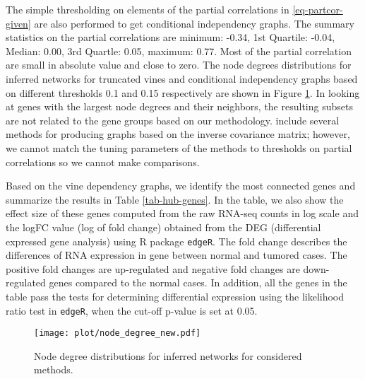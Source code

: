\documentclass[a4paper]{article}
\begin{document}
The simple thresholding on elements of the partial correlations in 
\eqref{eq-partcor-given}
are also performed to get conditional independency graphs. The summary
statistics on the partial correlations are minimum: -0.34, 1st Quartile:
-0.04, Median: 0.00, 3rd Quartle: 0.05, maximum: 0.77. 
Most of the partial correlation are small in absolute value and close to zero. 
 The node degrees distributions for inferred networks for truncated vines
and conditional independency graphs based on different thresholds 0.1 and
{0.15} respectively are shown in Figure \ref{fig-node-distribution}.
{In looking at genes with the largest node degrees and their neighbors,
the resulting subsets are not related to the gene groups based on our
methodology.}
\cite{lin2016estimation} include several methods for producing graphs based
on the inverse covariance matrix; however, we cannot match the tuning
parameters of the methods to thresholds on partial correlations so we cannot
make comparisons. 

Based on the vine dependency graphs, we identify the most connected genes and summarize the results in Table \ref{tab-hub-genes}. 
In the table, we also show the effect size of these genes computed from the
raw RNA-seq counts in log scale and the logFC value (log of fold change)
obtained from the DEG (differential expressed gene analysis) using R package
\texttt{edgeR}.
The fold change describes the differences of RNA expression in gene between normal and tumored cases. The positive fold changes are up-regulated and negative fold changes are down-regulated genes compared to the normal cases.
In addition, all the genes in the table pass the tests for determining
differential expression using the likelihood ratio test in \texttt{edgeR}, when the cut-off p-value is set at 0.05. 

\begin{figure}[!ht]
\centering
\texttt{[image: plot/node\_degree\_new.pdf]}
\caption{Node degree distributions for inferred networks for considered methods.}
\label{fig-node-distribution}
\end{figure}
\end{document}
